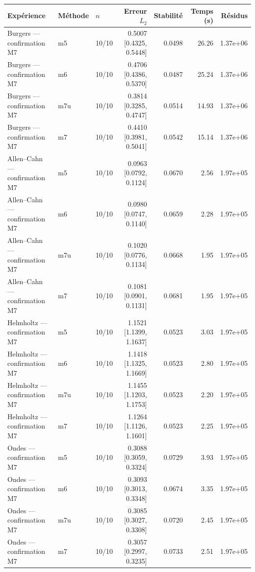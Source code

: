 \begin{tabular}{lllrrrr}
\toprule
Expérience & Méthode & $n$ & Erreur $L_2$ & Stabilité & Temps (s) & Résidus \\
\midrule
Burgers — confirmation M7 & m5 & 10/10 & 0.5007 [0.4325, 0.5448] & 0.0498 & 26.26 & 1.37e+06 \\
Burgers — confirmation M7 & m6 & 10/10 & 0.4706 [0.4386, 0.5370] & 0.0487 & 25.24 & 1.37e+06 \\
Burgers — confirmation M7 & m7u & 10/10 & 0.3814 [0.3285, 0.4747] & 0.0514 & 14.93 & 1.37e+06 \\
Burgers — confirmation M7 & m7 & 10/10 & 0.4410 [0.3981, 0.5041] & 0.0542 & 15.14 & 1.37e+06 \\
Allen–Cahn — confirmation M7 & m5 & 10/10 & 0.0963 [0.0792, 0.1124] & 0.0670 & 2.56 & 1.97e+05 \\
Allen–Cahn — confirmation M7 & m6 & 10/10 & 0.0980 [0.0747, 0.1140] & 0.0659 & 2.28 & 1.97e+05 \\
Allen–Cahn — confirmation M7 & m7u & 10/10 & 0.1020 [0.0776, 0.1134] & 0.0668 & 1.95 & 1.97e+05 \\
Allen–Cahn — confirmation M7 & m7 & 10/10 & 0.1081 [0.0901, 0.1131] & 0.0681 & 1.95 & 1.97e+05 \\
Helmholtz — confirmation M7 & m5 & 10/10 & 1.1521 [1.1399, 1.1637] & 0.0523 & 3.03 & 1.97e+05 \\
Helmholtz — confirmation M7 & m6 & 10/10 & 1.1418 [1.1325, 1.1669] & 0.0523 & 2.80 & 1.97e+05 \\
Helmholtz — confirmation M7 & m7u & 10/10 & 1.1455 [1.1203, 1.1753] & 0.0523 & 2.20 & 1.97e+05 \\
Helmholtz — confirmation M7 & m7 & 10/10 & 1.1264 [1.1126, 1.1601] & 0.0523 & 2.25 & 1.97e+05 \\
Ondes — confirmation M7 & m5 & 10/10 & 0.3088 [0.3059, 0.3324] & 0.0729 & 3.93 & 1.97e+05 \\
Ondes — confirmation M7 & m6 & 10/10 & 0.3093 [0.3013, 0.3348] & 0.0674 & 3.35 & 1.97e+05 \\
Ondes — confirmation M7 & m7u & 10/10 & 0.3085 [0.3027, 0.3308] & 0.0720 & 2.45 & 1.97e+05 \\
Ondes — confirmation M7 & m7 & 10/10 & 0.3057 [0.2997, 0.3235] & 0.0733 & 2.51 & 1.97e+05 \\
\bottomrule
\end{tabular}
